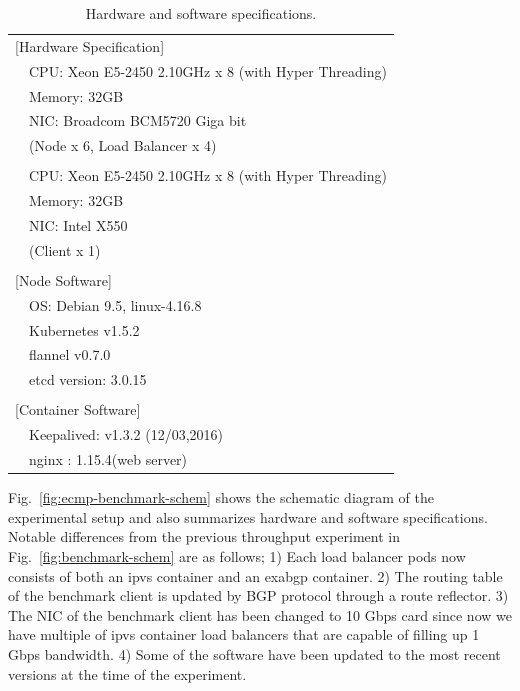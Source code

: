 {
\setlength{\tabcolsep}{1em}
\renewcommand{\arraystretch}{1.2}

\begin{table}[h]
  \centering
  \begin{tabular}{ll}
    \hline 
    \multicolumn{2}{l}{[Hardware Specification]}   \\
    & CPU: Xeon E5-2450 2.10GHz x 8 (with Hyper Threading) \\
    & Memory: 32GB \\
    & NIC: Broadcom BCM5720 Giga bit \\
    & (Node x 6, Load Balancer x 4) \\
    & \\
    & CPU: Xeon E5-2450 2.10GHz x 8 (with Hyper Threading) \\
    & Memory: 32GB \\
    & NIC: Intel X550 \\
    & (Client x 1) \\
    & \\
    \multicolumn{2}{l}{[Node Software]}  \\
    & OS: Debian 9.5, linux-4.16.8 \\
    & Kubernetes v1.5.2 \\
    & flannel v0.7.0 \\
    & etcd version: 3.0.15 \\
    & \\
    \multicolumn{2}{l}{[Container Software]}   \\
    & Keepalived: v1.3.2 (12/03,2016) \\
    & nginx : 1.15.4(web server) \\
  \hline 
  \end{tabular}
  \caption{Hardware and software specifications.}
  \label{tab:ecmp-hw_sw_spec}
\end{table}
}

Fig.~\ref{fig:ecmp-benchmark-schem} shows the schematic diagram of the experimental setup and also summarizes hardware and software specifications.
Notable differences from the previous throughput experiment in Fig.~\ref{fig:benchmark-schem} are as follows;
1) Each load balancer pods now consists of both an ipvs container and an exabgp container.
2) The routing table of the benchmark client is updated by BGP protocol through a route reflector.
3) The NIC of the benchmark client has been changed to 10 Gbps card since now we have multiple of ipvs container load balancers that are capable of filling up 1 Gbps bandwidth.
4) Some of the software have been updated to the most recent versions at the time of the experiment.

